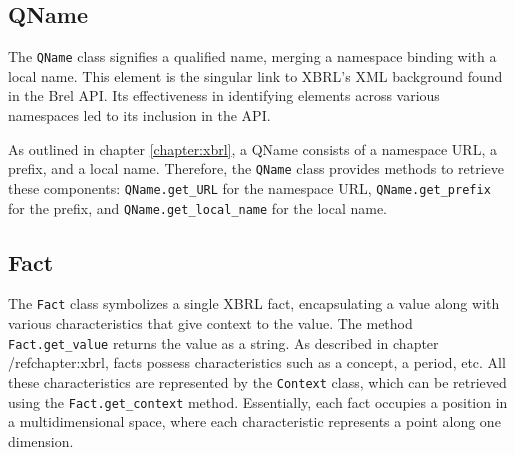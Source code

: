 \subsection{QName}
\label{subsec:qname}

The \texttt{QName} class signifies a qualified name, merging a namespace binding with a local name.  
This element is the singular link to XBRL's XML background found in the Brel API.  
Its effectiveness in identifying elements across various namespaces led to its inclusion in the API.  

As outlined in chapter \ref{chapter:xbrl}, a QName consists of a namespace URL, a prefix, and a local name.  
Therefore, the \texttt{QName} class provides methods to retrieve these components:  
\texttt{QName.get\_URL} for the namespace URL, \texttt{QName.get\_prefix} for the prefix, and \texttt{QName.get\_local\_name} for the local name.

\subsection{Fact}
\label{subsec:fact}

The \texttt{Fact} class symbolizes a single XBRL fact, encapsulating a value along with various characteristics that give context to the value.
The method \texttt{Fact.get\_value} returns the value as a string.
As described in chapter /ref{chapter:xbrl}, facts possess characteristics such as a concept, a period, etc.
All these characteristics are represented by the \texttt{Context} class, 
which can be retrieved using the \texttt{Fact.get\_context} method.
Essentially, each fact occupies a position in a multidimensional space, where each characteristic represents a point along one dimension.

